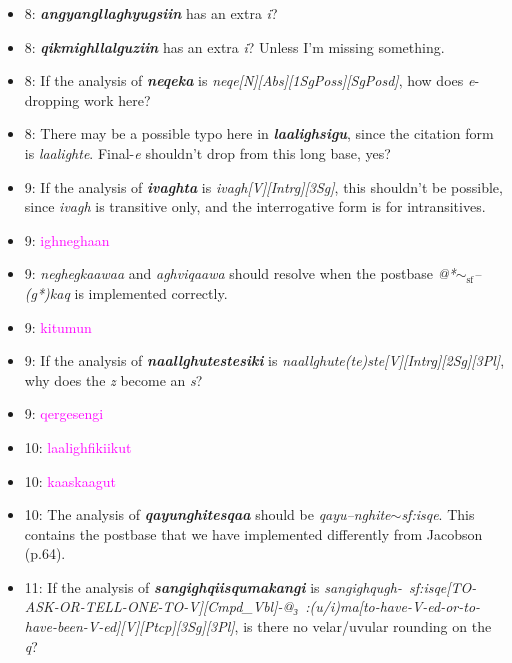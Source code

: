 \documentclass{article}
\begin{document}
\begin{itemize}
\item 8: \textit{\textbf{angyangllaghyugsiin}} has an extra \textit{i}?

\item 8: \textit{\textbf{qikmighllalguziin}} has an extra \textit{i}?
%
Unless I'm missing something.

\item 8: If the analysis of \textit{\textbf{neqeka}} is \textit{neqe[N][Abs][1SgPoss][SgPosd]}, how does \textit{e}-dropping work here?

\item 8: There may be a possible typo here in \textit{\textbf{laalighsigu}}, since the citation form is \textit{laalighte}.
%
Final-\textit{e} shouldn't drop from this long base, yes?

\item 9: If the analysis of \textit{\textbf{ivaghta}} is \textit{ivagh[V][Intrg][3Sg]}, this shouldn't be possible, since \textit{ivagh} is transitive only, and the interrogative form is for intransitives.

\item 9: \textcolor{magenta}{ighneghaan}

\item 9: \textit{neghegkaawaa} and \textit{aghviqaawa} should resolve when the postbase \textit{@*$\sim_\text{sf}$--(g*)kaq} is implemented correctly.

\item 9: \textcolor{magenta}{kitumun}

\item 9: If the analysis of \textit{\textbf{naallghutestesiki}} is \textit{naallghute(te)ste[V][Intrg][2Sg][3Pl]}, why does the \textit{z} become an \textit{s}?

\item 9: \textcolor{magenta}{qergesengi}

\item 10: \textcolor{magenta}{laalighfikiikut}

\item 10: \textcolor{magenta}{kaaskaagut}

\item 10: The analysis of \textit{\textbf{qayunghitesqaa}} should be \textit{qayu--nghite$\sim$sf:isqe}.
%
This contains the postbase that we have implemented differently from Jacobson (p.64).

\item 11: If the analysis of \textit{\textbf{sangighqiisqumakangi}} is \textit{sangighqugh-~sf:isqe[TO-ASK-OR-TELL-ONE-TO-V][Cmpd\_Vbl]-@₃~:(u/i)ma[to-have-V-ed-or-to-have-been-V-ed][V][Ptcp][3Sg][3Pl]}, is there no velar/uvular rounding on the \textit{q}?


\end{itemize}
\end{document}
